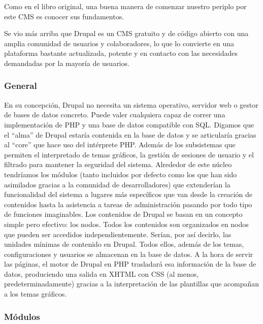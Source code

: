 \par Como en el libro original, una buena manera de comenzar nuestro periplo por este CMS es conocer sus fundamentos.
\par Se vio más arriba que Drupal es un CMS gratuito y de código abierto con una amplia comunidad de usuarios y colaboradores, lo que lo convierte en una plataforma bastante actualizada, potente y en contacto con las necesidades demandadas por la mayoría de usuarios.

\subsubsection{General}

\par En su concepción, Drupal no necesita un sistema operativo, servidor web o gestor de bases de datos concreto. Puede valer cualquiera capaz de correr una implementación de PHP y una base de datos compatible con SQL. Digamos que el ``alma'' de Drupal estaría contenida en la base de datos y se articularía gracias al ``core'' que hace uso del intérprete PHP. Además de los subsistemas que permiten el interpretado de temas gráficos, la gestión de sesiones de usuario y el filtrado para mantener la seguridad del sistema. Alrededor de este núcleo tendríamos los módulos (tanto incluidos por defecto como los que han sido asimilados gracias a la comunidad de desarrolladores) que extenderían la funcionalidad del sistema a lugares más específicos que van desde la creación de contenidos hasta la asistencia a tareas de administración pasando por todo tipo de funciones imaginables.
Los contenidos de Drupal se basan en un concepto simple pero efectivo: los nodos. Todos los contenidos son organizados en nodos que pueden ser accedidos independientemente. Serían, por así decirlo, las unidades mínimas de contenido en Drupal. Todos ellos, además de los temas, configuraciones y usuarios se almacenan en la base de datos. A la hora de servir las páginas, el motor de Drupal en PHP trasladará esa información de la base de datos, produciendo una salida en XHTML con CSS (al menos, predeterminadamente) gracias a la interpretación de las plantillas que acompañan a los temas gráficos.

\subsubsection{Módulos}

